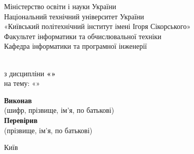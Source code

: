\begin{titlepage}
	\begin{center}
		\Large
		Міністерство освіти і науки України \\
		Національний технічний університет України \\
		«Київський політехнічний інститут імені Ігоря Сікорського» \\
		[1\baselineskip]
		Факультет інформатики та обчислювальної техніки \\
		Кафедра інформатики та програмної інженерії \\
	\end{center}

	\vfill

	\begin{center}
		\Large
		\textbf{\TITLE} \\
		з дисципліни \textbf{«\DISCIPLINE»} \\
		на тему: «\SUBJECT»
	\end{center}

	\vfill

	\begin{center}
		\large
		\textbf{Виконав} \hfill \noindent \hrulefill \STUDENT \hrulefill \\
		\small (шифр, прізвище, ім'я, по батькові) \\
		[1\baselineskip]
		\large
		\textbf{Перевірив} \hfill \noindent \hrulefill \TEACHER \hrulefill \\
		\small (прізвище, ім'я, по батькові) \\
	\end{center}

	\vfill

	\begin{center}
		\Large
		Київ \the\year{}
	\end{center}
\end{titlepage}
